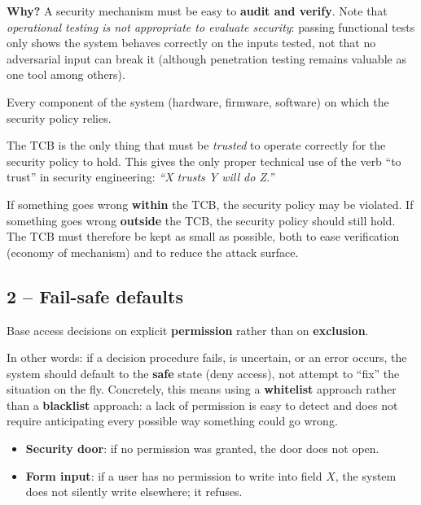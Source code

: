 \textbf{Why?} A security mechanism must be easy to \textbf{audit and verify}. Note that \emph{operational testing is not appropriate to evaluate security}: passing functional tests only shows the system behaves correctly on the inputs tested, not that no adversarial input can break it (although penetration testing remains valuable as one tool among others).

\begin{definition}
Every component of the system (hardware, firmware, software) on which the security policy relies.
\end{definition}

The TCB is the only thing that must be \emph{trusted} to operate correctly for the security policy to hold. This gives the only proper technical use of the verb ``to trust'' in security engineering: \emph{``X trusts Y will do Z.''}

\begin{remark}
If something goes wrong \textbf{within} the TCB, the security policy may be violated. If something goes wrong \textbf{outside} the TCB, the security policy should still hold. The TCB must therefore be kept as small as possible, both to ease verification (economy of mechanism) and to reduce the attack surface.
\end{remark}

\subsection{2 -- Fail-safe defaults}

\begin{definition}
Base access decisions on explicit \textbf{permission} rather than on \textbf{exclusion}.
\end{definition}

In other words: if a decision procedure fails, is uncertain, or an error occurs, the system should default to the \textbf{safe} state (deny access), not attempt to ``fix'' the situation on the fly. Concretely, this means using a \textbf{whitelist} approach rather than a \textbf{blacklist} approach: a lack of permission is easy to detect and does not require anticipating every possible way something could go wrong.

\begin{example}
\begin{itemize}
    \item \textbf{Security door}: if no permission was granted, the door does not open.
    \item \textbf{Form input}: if a user has no permission to write into field $X$, the system does not silently write elsewhere; it refuses.
\end{itemize}
\end{example}

